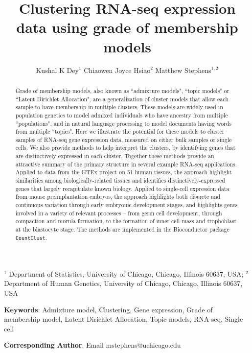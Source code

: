\title{\Large{\textbf{Clustering RNA-seq expression data using grade of membership models}}}
\author{ Kushal K Dey$^{1}$  \qquad Chiaowen Joyce Hsiao$^{2}$ \qquad Matthew Stephens$^{1,2}$}

\maketitle

$^{1}$ Department of Statistics, University of Chicago, Chicago, Illinois 60637, USA;  $^{2}$ Department of Human Genetics, University of Chicago, Chicago, Illinois 60637, USA

\textbf{Keywords}: Admixture model, Clustering, Gene expression, Grade of membership model, Latent Dirichlet Allocation, Topic models, RNA-seq, Single cell

\textbf{Corresponding Author}: Email mstephens@uchicago.edu
					      


\newpage

\begin{abstract}
Grade of membership models, also known as ``admixture models", ``topic models" or ``Latent Dirichlet Allocation",
are a generalization of cluster models that allow each sample to have membership in multiple clusters.
These models are widely used in population genetics to model admixed individuals who have ancestry from multiple ``populations", 
and in natural language processing to model documents having words from multiple ``topics". Here we illustrate the potential for these models
to cluster samples of RNA-seq gene expression data, measured on either bulk samples or single cells. 
We also provide methods to help interpret the clusters, by identifying genes that are distinctively expressed in each cluster. 
Together these methods provide an attractive summary of the primary structure in several example RNA-seq applications. Applied to
data from the GTEx project on 51 human tissues, the approach highlight similarities among biologically-related tissues and
identifies distinctively-expressed genes that largely recapitulate known biology.  Applied to single-cell expression data from 
mouse preimplantation embryos, the approach highlights both discrete and continuous variation through early embryonic development stages,
and highlights genes involved in a variety of relevant processes -- from germ cell development, through compaction and morula formation, to
the formation of inner cell mass and trophoblast at the blastocyte stage.
The methods are implemented in the Bioconductor package                                   {\tt CountClust}.
\end{abstract}

